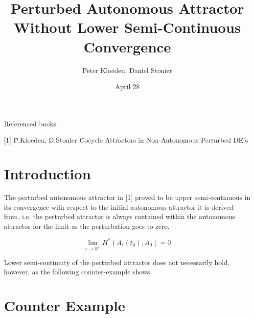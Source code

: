 
\parskip 3mm
\parindent 0mm

\newlength{\widen} \newlength{\heighten}

\setlength{\widen}{0.55in}
\setlength{\heighten}{0.55in}

\addtolength{\oddsidemargin}{-\widen}
\addtolength{\evensidemargin}{-\widen}
\addtolength{\textwidth}{2\widen}
\addtolength{\topmargin}{-\heighten}
\addtolength{\textheight}{2\heighten}
\addtolength{\oddsidemargin}{+0.0in}
\addtolength{\evensidemargin}{-0.0in}

\title{Perturbed Autonomous Attractor Without Lower Semi-Continuous
            Convergence}
\author{Peter Kloeden, Daniel Stonier}
\date{April 28}

\newtheorem{defn}{Definition}[section]
\newtheorem{eg}{Example}[section]
\newtheorem{therm}{Theorem}[section]
\newtheorem{lemma}{Lemma}[section]




\maketitle

Referenced books.
\begin{tabbing}
  \hspace{1cm} [1] \= P.Kloeden, D.Stonier \hspace{4mm} \= Cocycle
Attractors
            in Non-Autonomous Perturbed DE's \\ \end{tabbing}

\section{Introduction}

The perturbed autonomous attractor in [1] proved to be upper
semi-continuous in its convergence with respect to the initial
autonomous attractor it is derived from, i.e. the perturbed
attractor is always contained within the autonomous attractor for
the limit as the perturbation goes to zero.

\[ \lim_{\epsilon \rightarrow 0^{+}} H^{*}(A_{\epsilon}(t_{0}),A_{0}) = 0
\]

Lower semi-continuity of the perturbed attractor does not necessarily
hold, however, as the following counter-example shows.

\section{Counter Example}

